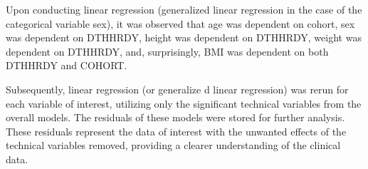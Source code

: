 \documentclass[a4paper, 11pt]{article}
\begin{document}
\begin{multicols}{2}
Upon conducting linear regression (generalized linear regression in the case of the categorical variable sex), it was observed that age was dependent on cohort, sex was dependent on DTHHRDY, height was dependent on DTHHRDY, weight was dependent on DTHHRDY, and, surprisingly, BMI was dependent on both DTHHRDY and COHORT.

Subsequently, linear regression (or generalize d linear regression) was rerun for each variable of interest, utilizing only the significant technical variables from the overall models.
The residuals of these models were stored for further analysis.
These residuals represent the data of interest with the unwanted effects of the technical variables removed, providing a clearer understanding of the clinical data.



\end{multicols}
\end{document}
